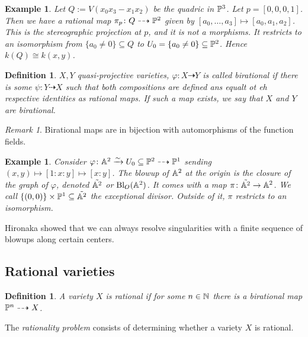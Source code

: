 \documentclass[A4paper, british, reqno]{amsart}
\theoremstyle{darkgreentheorem}
\theoremstyle{darkbluedefinition}
\newtheorem{defn}[thm]{Definition}
\theoremstyle{darkredexample}
\newtheorem{exa}[thm]{Example}
\theoremstyle{remark}
\newtheorem{rem}[thm]{Remark}
\newcommand{\1}{\mathbbm{1}}
\newcommand{\sub}{\subseteq}
\begin{document}
\begin{exa}
    Let $Q:=V(x_{0}x_{3}-x_{1}x_{2})$ be the quadric in $\P^{3}$.
    Let $p=[0,0,0,1]$.
    Then we have a rational map $\pi_{p}\colon Q\dashrightarrow \P^{2}$ given by $[a_{0},\ldots,a_{3}]\mapsto [a_{0},a_{1},a_{2}]$.
    This is the stereographic projection at $p$, and it is not a morphisms.
    It restricts to an isomorphism from $\{a_{0}\neq 0\}\sub Q$ to $U_{0}=\{ a_{0}\neq 0 \} \sub \P^{2}$.
    Hence $k(Q)\cong k(x,y)$.
\end{exa}

\begin{defn}
    $X,Y$ quasi-projective varieties, $\varphi\colon X\dashrightarrow Y$ is called \textit{birational} if there is some $\psi\colon Y\dashrightarrow X$ such that both compositions are defined ans equalt ot eh respective identities as rational maps.
    If such a map exists, we say that $X$ and $Y$ are birational.
\end{defn}

\begin{rem}
    Birational maps are in bijection with automorphisms of the function fields.
\end{rem}

\begin{exa}
    Consider $\varphi\colon \A^{2}\xrightarrow{\sim} U_{0}\sub \P^{2}\dashrightarrow \P^{1}$ sending $(x,y)\mapsto [1:x:y]\mapsto [x:y]$.
    The blowup of $\A^{2}$ at the origin is the closure of the graph of $\varphi$, denoted $\tilde{\A^{2}}$ or $\operatorname{Bl}_{O}(\A^{2})$.
    It comes with a map $\pi\colon \tilde{\A^{2}}\to \A^{2}$.
    We call $\{(0,0)\}\times \P^{1}\sub \tilde{\A^{2}}$ the \textit{exceptional divisor}.
    Outside of it, $\pi$ restricts to an isomorphism.
\end{exa}

Hironaka showed that we can always resolve singularities with a finite sequence of blowups along certain centers.

\subsection{Rational varieties}

\begin{defn}
    A variety $X$ is rational if for some $n\in \N$ there is a birational map $\P^{n}\dashrightarrow X$.
\end{defn}

The \textit{rationality problem} consists of determining whether a variety $X$ is rational.
\end{document}
